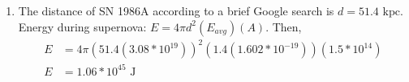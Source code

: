 \documentclass{article}
\begin{document}
\begin{enumerate}
    \item
    
    The distance of SN 1986A according to a brief Google search is $d=51.4\text{ kpc}$. Energy during supernova: $E=4\pi d^2(E_{avg})(A)$. Then, 
    \begin{align*}
        E &= 4\pi (51.4(3.08*10^{19}))^2(1.4(1.602*10^{-19}))(1.5*10^{14})\\
        E &= 1.06*10^{45}\text{ J}
    \end{align*}
    
\end{enumerate}
\end{document}
